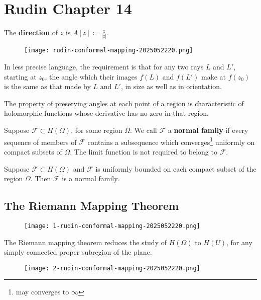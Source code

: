 \section{Rudin Chapter 14}

The \textbf{direction} of $z$ is $A[z]\coloneqq\frac{z}{\lvert z \rvert}$.

\begin{definition}
\begin{figure}[H]
\centering
\texttt{[image: rudin-conformal-mapping-2025052220.png]}
\label{}
\end{figure}
\end{definition}
In less precise language, the requirement is that for any two rays $L$ and $L'$, starting at $z_0$, the angle which their images $f(L)$ and $f(L')$ make at $f(z_0)$ is the same as that made by $L$ and $L'$, in size as well as in orientation.

The property of preserving angles at each point of a region is characteristic of holomorphic functions whose derivative has no zero in that region.

\begin{definition}
Suppose $\mathscr{F} \subset H(\Omega)$, for some region $\Omega$. We call $\mathscr{F}$ a \textbf{normal family} if every sequence of members of $\mathscr{F}$ contains a subsequence which converges\footnote{may converges to $\infty$} uniformly on compact subsets of $\Omega$. The limit function is not required to belong to $\mathscr{F}$.
\end{definition}
\begin{theorem}
Suppose $\mathscr{F} \subset H(\Omega)$ and $\mathscr{F}$ is uniformly bounded on each compact subset of the region $\Omega$. Then $\mathscr{F}$ is a normal family.
\end{theorem}
\subsection{The Riemann Mapping Theorem}

\begin{figure}[H]
\centering
\texttt{[image: 1-rudin-conformal-mapping-2025052220.png]}
\label{}
\end{figure}

The Riemann mapping theorem reduces the study of $H(\Omega)$ to $H(U)$, for any simply connected proper subregion of the plane.

\begin{figure}[H]
\centering
\texttt{[image: 2-rudin-conformal-mapping-2025052220.png]}
\label{}
\end{figure}

